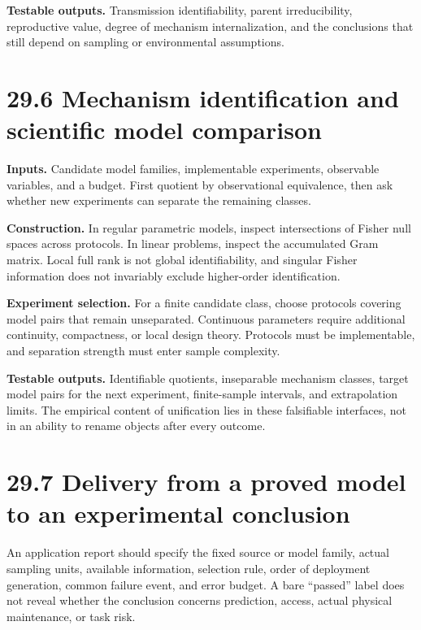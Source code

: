 \documentclass[
  english,
  11pt,
  oneside]{book}
\begin{document}
\textbf{Testable outputs.} Transmission identifiability, parent irreducibility, reproductive value, degree of mechanism internalization, and the conclusions that still depend on sampling or environmental assumptions.

\section{29.6 Mechanism identification and scientific model comparison}\label{mechanism-identification-and-scientific-model-comparison}

\textbf{Inputs.} Candidate model families, implementable experiments, observable variables, and a budget. First quotient by observational equivalence, then ask whether new experiments can separate the remaining classes.

\textbf{Construction.} In regular parametric models, inspect intersections of Fisher null spaces across protocols. In linear problems, inspect the accumulated Gram matrix. Local full rank is not global identifiability, and singular Fisher information does not invariably exclude higher-order identification.

\textbf{Experiment selection.} For a finite candidate class, choose protocols covering model pairs that remain unseparated. Continuous parameters require additional continuity, compactness, or local design theory. Protocols must be implementable, and separation strength must enter sample complexity.

\textbf{Testable outputs.} Identifiable quotients, inseparable mechanism classes, target model pairs for the next experiment, finite-sample intervals, and extrapolation limits. The empirical content of unification lies in these falsifiable interfaces, not in an ability to rename objects after every outcome.

\section{29.7 Delivery from a proved model to an experimental conclusion}\label{delivery-from-a-proved-model-to-an-experimental-conclusion}

An application report should specify the fixed source or model family, actual sampling units, available information, selection rule, order of deployment generation, common failure event, and error budget. A bare ``passed'' label does not reveal whether the conclusion concerns prediction, access, actual physical maintenance, or task risk.
\end{document}
